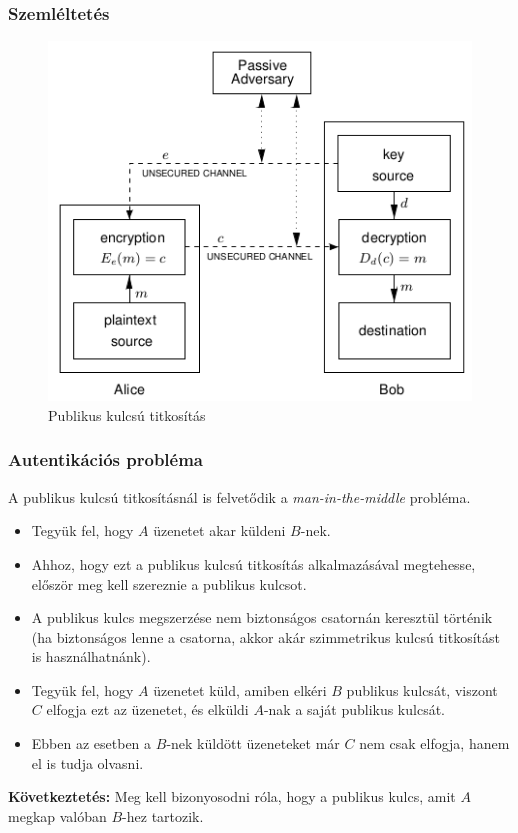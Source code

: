\documentclass{beamer}
\begin{document}
\begin{frame}
    \frametitle{Szemléltetés}

    \begin{figure}[h]
        \centering
        \includegraphics[scale=0.5]{encryption.png}
        \caption{Publikus kulcsú titkosítás \cite{Menezes2001}}
        \label{fig_encryption}
    \end{figure}
\end{frame}

\begin{frame}
    \frametitle{Autentikációs probléma}

    A publikus kulcsú titkosításnál is felvetődik a \textit{man-in-the-middle} probléma.

    \begin{itemize}
        \item Tegyük fel, hogy $A$ üzenetet akar küldeni $B$-nek.
        \item Ahhoz, hogy ezt a publikus kulcsú titkosítás alkalmazásával megtehesse, először meg kell szereznie a
              publikus kulcsot.
        \item A publikus kulcs megszerzése nem biztonságos csatornán keresztül történik (ha biztonságos lenne a csatorna,
              akkor akár szimmetrikus kulcsú titkosítást is használhatnánk).
        \item Tegyük fel, hogy $A$ üzenetet küld, amiben elkéri $B$ publikus kulcsát, viszont $C$ elfogja ezt az üzenetet,
              és elküldi $A$-nak a saját publikus kulcsát.
        \item Ebben az esetben a $B$-nek küldött üzeneteket már $C$ nem csak elfogja, hanem el is tudja olvasni.
    \end{itemize}

    \textbf{Következtetés:} Meg kell bizonyosodni róla, hogy a publikus kulcs, amit $A$ megkap valóban $B$-hez tartozik.
\end{frame}
\end{document}

